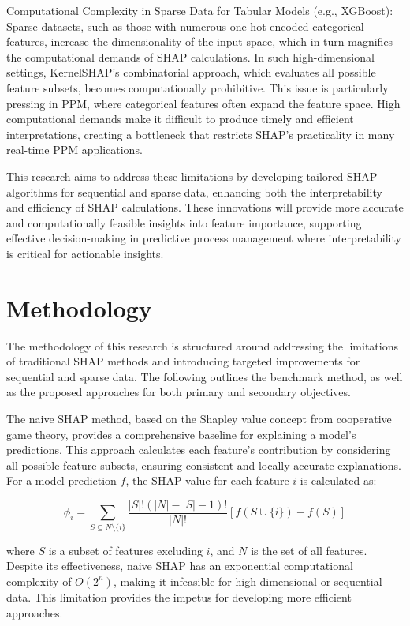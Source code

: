 Computational Complexity in Sparse Data for Tabular Models (e.g., XGBoost): Sparse datasets, such as those with numerous one-hot encoded categorical features, increase the dimensionality of the input space, which in turn magnifies the computational demands of SHAP calculations. In such high-dimensional settings, KernelSHAP’s combinatorial approach, which evaluates all possible feature subsets, becomes computationally prohibitive. This issue is particularly pressing in PPM, where categorical features often expand the feature space. High computational demands make it difficult to produce timely and efficient interpretations, creating a bottleneck that restricts SHAP’s practicality in many real-time PPM applications.

This research aims to address these limitations by developing tailored SHAP algorithms for sequential and sparse data, enhancing both the interpretability and efficiency of SHAP calculations. These innovations will provide more accurate and computationally feasible insights into feature importance, supporting effective decision-making in predictive process management where interpretability is critical for actionable insights.

\section{Methodology}

The methodology of this research is structured around addressing the limitations of traditional SHAP methods and introducing targeted improvements for sequential and sparse data. The following outlines the benchmark method, as well as the proposed approaches for both primary and secondary objectives.

The naive SHAP method, based on the Shapley value concept from cooperative game theory, provides a comprehensive baseline for explaining a model’s predictions. This approach calculates each feature's contribution by considering all possible feature subsets, ensuring consistent and locally accurate explanations. For a model prediction \( f \), the SHAP value for each feature \( i \) is calculated as:

\begin{equation}
\label{eq:shap}
\phi_i = \sum_{S \subseteq N \setminus \{i\}} \frac{|S|!(|N| - |S| - 1)!}{|N|!} \left[ f(S \cup \{i\}) - f(S) \right]
\end{equation}

where \( S \) is a subset of features excluding \( i \), and \( N \) is the set of all features. Despite its effectiveness, naive SHAP has an exponential computational complexity of \( O(2^n) \), making it infeasible for high-dimensional or sequential data. This limitation provides the impetus for developing more efficient approaches.

